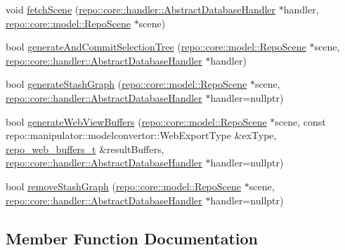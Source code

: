 \begin{DoxyCompactItemize}
\item 
void \hyperlink{classrepo_1_1manipulator_1_1modelutility_1_1_scene_manager_a48727470d70808f4798c88d6ed4537c5}{fetch\+Scene} (\hyperlink{classrepo_1_1core_1_1handler_1_1_abstract_database_handler}{repo\+::core\+::handler\+::\+Abstract\+Database\+Handler} $\ast$handler, \hyperlink{classrepo_1_1core_1_1model_1_1_repo_scene}{repo\+::core\+::model\+::\+Repo\+Scene} $\ast$scene)
\item 
bool \hyperlink{classrepo_1_1manipulator_1_1modelutility_1_1_scene_manager_a6d46d5e7e950bb7fdb7d33dbcb68288b}{generate\+And\+Commit\+Selection\+Tree} (\hyperlink{classrepo_1_1core_1_1model_1_1_repo_scene}{repo\+::core\+::model\+::\+Repo\+Scene} $\ast$scene, \hyperlink{classrepo_1_1core_1_1handler_1_1_abstract_database_handler}{repo\+::core\+::handler\+::\+Abstract\+Database\+Handler} $\ast$handler)
\item 
bool \hyperlink{classrepo_1_1manipulator_1_1modelutility_1_1_scene_manager_a41c0fbd6443b3df78aa922b303963f49}{generate\+Stash\+Graph} (\hyperlink{classrepo_1_1core_1_1model_1_1_repo_scene}{repo\+::core\+::model\+::\+Repo\+Scene} $\ast$scene, \hyperlink{classrepo_1_1core_1_1handler_1_1_abstract_database_handler}{repo\+::core\+::handler\+::\+Abstract\+Database\+Handler} $\ast$handler=nullptr)
\item 
bool \hyperlink{classrepo_1_1manipulator_1_1modelutility_1_1_scene_manager_a56d372073aa4d37c3b2f45d02b930929}{generate\+Web\+View\+Buffers} (\hyperlink{classrepo_1_1core_1_1model_1_1_repo_scene}{repo\+::core\+::model\+::\+Repo\+Scene} $\ast$scene, const repo\+::manipulator\+::modelconvertor\+::\+Web\+Export\+Type \&ex\+Type, \hyperlink{structrepo__web__buffers__t}{repo\+\_\+web\+\_\+buffers\+\_\+t} \&result\+Buffers, \hyperlink{classrepo_1_1core_1_1handler_1_1_abstract_database_handler}{repo\+::core\+::handler\+::\+Abstract\+Database\+Handler} $\ast$handler=nullptr)
\item 
bool \hyperlink{classrepo_1_1manipulator_1_1modelutility_1_1_scene_manager_a58af7cd9d7f5f0b0f080914495b82083}{remove\+Stash\+Graph} (\hyperlink{classrepo_1_1core_1_1model_1_1_repo_scene}{repo\+::core\+::model\+::\+Repo\+Scene} $\ast$scene, \hyperlink{classrepo_1_1core_1_1handler_1_1_abstract_database_handler}{repo\+::core\+::handler\+::\+Abstract\+Database\+Handler} $\ast$handler=nullptr)
\end{DoxyCompactItemize}


\subsection{Member Function Documentation}
\hypertarget{classrepo_1_1manipulator_1_1modelutility_1_1_scene_manager_a393159e2171e330dff17c601022b59e6}{}
